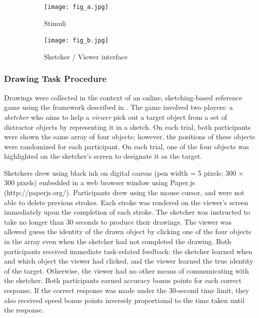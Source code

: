\documentclass[10pt,letterpaper]{article}
\begin{document}


\begin{figure}
\begin{subfigure}{0.23\textwidth}
\texttt{[image: fig\_a.jpg]}
\caption{Stimuli} \label{fig:1a}
\end{subfigure}
\hspace*{\fill} 
\begin{subfigure}{0.23\textwidth}
\texttt{[image: fig\_b.jpg]}
\caption{Sketcher / Viewer interface} \label{fig:1b}
\end{subfigure}
\caption{} \label{fig:1}
\end{figure}

\subsubsection{Drawing Task Procedure}
Drawings were collected in the context of an online, sketching-based reference game using the framework described in . The game involved two players: a \textit{sketcher} who aims to help a \textit{viewer} pick out a target object from a set of distractor objects by representing it in a sketch. On each trial, both participants were shown the same array of four objects; however, the positions of these objects were randomized for each participant. On each trial, one of the four objects was highlighted on the sketcher's screen to designate it as the target.

Sketchers drew using black ink on digital canvas (pen width = 5 pixels; 300 $\times$ 300 pixels) embedded in a web browser window using Paper.js (http://paperjs.org/). Participants drew using the mouse cursor, and were not able to delete previous strokes. Each stroke was rendered on the viewer's screen immediately upon the completion of each stroke. The sketcher was instructed to take no longer than 30 seconds to produce their drawings. The viewer was allowed guess the identity of the drawn object by clicking one of the four objects in the array even when the sketcher had not completed the drawing. Both participants received immediate task-related feedback: the sketcher learned when and which object the viewer had clicked, and the viewer learned the true identity of the target. Otherwise, the viewer had no other means of communicating with the sketcher. Both participants earned accuracy bonus points for each correct response. If the correct response was made under the 30-second time limit, they also received speed bonus points inversely proportional to the time taken until the response. 
\end{document}
